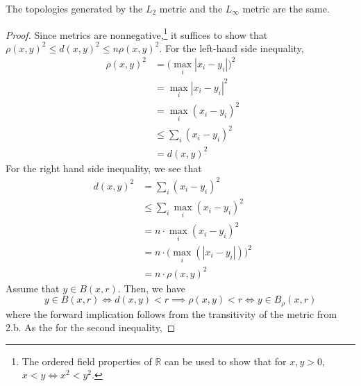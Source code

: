       \begin{theorem} 
        The topologies generated by the $L_2$ metric and the $L_\infty$ metric are the same. 
      \end{theorem} 
      \begin{proof}
        Since metrics are nonnegative,\footnote{The ordered field properties of $\mathbb{R}$ can be used to show that for $x, y > 0$, $x < y \iff x^2 < y^2$.} it suffices to show that $\rho(x, y)^2 \leq d(x, y)^2 \leq n \rho (x, y)^2$. For the left-hand side inequality, 
        \begin{align}
          \rho(x, y)^2 & = \big( \max_i |x_i - y_i| \big)^2 && \tag{definition of $L_\infty$ metric}\\
                       & = \max_i | x_i - y_i|^2 && \tag{can move square inside since $|x_i - y_i| > 0$ for all $i$}\\
                       & = \max_i (x_i - y_i)^2 && \tag{absolute value is irrlevant if we are squaring it}\\
                       & \leq \sum_i (x_i - y_i)^2 && \tag{sum contains the max with all nonnegative elements}\\
                       & = d(x, y)^2 && \tag{definition of $L_2$ metric}
        \end{align}
        For the right hand side inequality, we see that 
        \begin{align}
          d(x, y)^2 & = \sum_i (x_i - y_i)^2 && \tag{definition of $L_2$ metric}\\
                    & \leq \sum_i \max_i ( x_i - y_i)^2 && \tag{bound each element by the max of the elements}\\
                    & = n \cdot \max_i (x_i - y_i)^2 && \tag{since it's a sum of constant elements}\\
                    & = n \cdot \big( \max_i (|x_i - y_i|)\big)^2 && \tag{equivalent by previous logic}\\
                    & = n \cdot \rho(x, y)^2 && \tag{definition of $L_\infty$ norm}
        \end{align}
        Assume that $y \in B(x, r)$. Then, we have 
        \begin{equation}
          y \in B(x, r) \iff d(x, y) < r \implies \rho(x, y) < r \iff y \in B_\rho (x, r) 
        \end{equation}
        where the forward implication follows from the transitivity of the metric from 2.b. As the for the second inequality, 

\end{proof}
